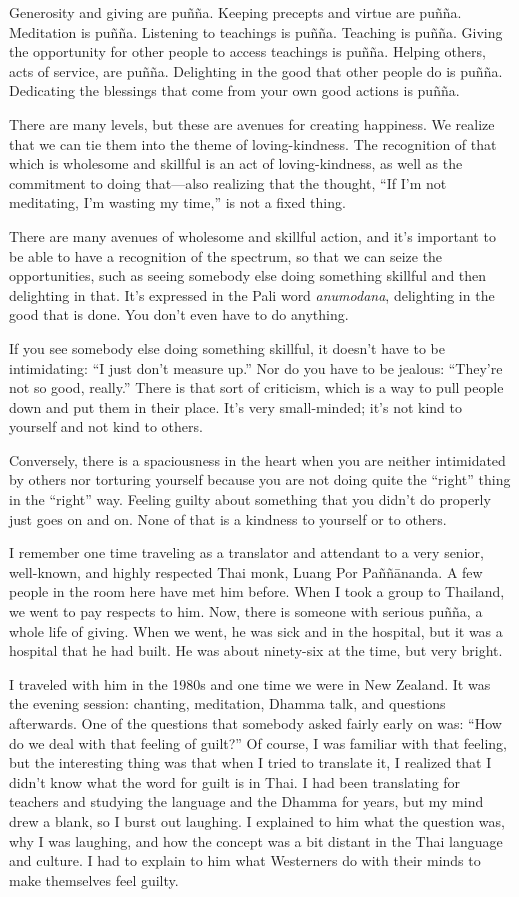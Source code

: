 Generosity and giving are puñña. Keeping precepts and virtue are puñña.
Meditation is puñña. Listening to teachings is puñña. Teaching is puñña.
Giving the opportunity for other people to access teachings is puñña.
Helping others, acts of service, are puñña. Delighting in the good that
other people do is puñña. Dedicating the blessings that come from your
own good actions is puñña.

There are many levels, but these are avenues for creating happiness. We
realize that we can tie them into the theme of loving-kindness. The
recognition of that which is wholesome and skillful is an act of
loving-kindness, as well as the commitment to doing that—also realizing
that the thought, “If I’m not meditating, I’m wasting my time,” is not a
fixed thing.

There are many avenues of wholesome and skillful action, and it’s
important to be able to have a recognition of the spectrum, so that we
can seize the opportunities, such as seeing somebody else doing
something skillful and then delighting in that. It’s expressed in the
Pali word \emph{anumodana}, delighting in the good that is done. You
don’t even have to do anything.

If you see somebody else doing something skillful, it doesn’t have to be
intimidating: “I just don’t measure up.” Nor do you have to be jealous:
“They’re not so good, really.” There is that sort of criticism, which is
a way to pull people down and put them in their place. It’s very
small-minded; it’s not kind to yourself and not kind to others.

Conversely, there is a spaciousness in the heart when you are neither
intimidated by others nor torturing yourself because you are not doing
quite the “right” thing in the “right” way. Feeling guilty about
something that you didn’t do properly just goes on and on. None of that
is a kindness to yourself or to others.

I remember one time traveling as a translator and attendant to a very
senior, well-known, and highly respected Thai monk, Luang Por
Paññānanda. A few people in the room here have met him before. When I
took a group to Thailand, we went to pay respects to him. Now, there is
someone with serious puñña, a whole life of giving. When we went, he was
sick and in the hospital, but it was a hospital that he had built. He
was about ninety-six at the time, but very bright.

I traveled with him in the 1980s and one time we were in New Zealand. It
was the evening session: chanting, meditation, Dhamma talk, and
questions afterwards. One of the questions that somebody asked fairly
early on was: “How do we deal with that feeling of guilt?” Of course, I
was familiar with that feeling, but the interesting thing was that when
I tried to translate it, I realized that I didn’t know what the word for
guilt is in Thai. I had been translating for teachers and studying the
language and the Dhamma for years, but my mind drew a blank, so I burst
out laughing. I explained to him what the question was, why I was
laughing, and how the concept was a bit distant in the Thai language and
culture. I had to explain to him what Westerners do with their minds to
make themselves feel guilty.

